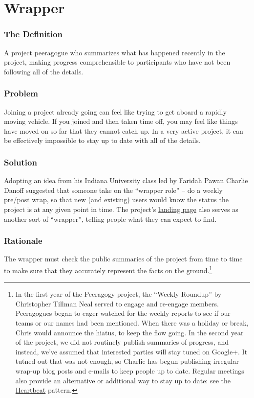 \section{Wrapper}\label{sec:Wrapper}
\subsubsection*{The Definition} A project peeragogue who summarizes what has happened recently in the project, making progress comprehensible to participants who have not been following all of the details.

\subsubsection*{Problem} Joining a project already going can feel like trying to get aboard a rapidly moving vehicle. If you joined and then taken time off, you may feel like things have moved on so far that they cannot catch up. In a very active project, it can be effectively impossible to stay up to date with all of the details.

\subsubsection*{Solution}
Adopting an idea from his Indiana University class led by Faridah Pawan Charlie Danoff suggested that someone take on the ``wrapper role'' -- do a weekly pre/post wrap, so that new (and existing) users would know the status the project is at any given point in time. The project's \href{http://socialmediaclassroom.com/host/peeragogy/}{landing page} also serves as another sort of ``wrapper'', telling people what they can expect to find.

\subsubsection*{Rationale}
The wrapper must check the public summaries of the project from time to time to make sure that they accurately represent the facts on the ground.\footnote{In the first year of the Peeragogy project, the ``Weekly Roundup'' by Christopher Tillman Neal served to engage and re-engage members. Peeragogues began to eager watched for the weekly reports to see if our teams or our names had been mentioned. When there was a holiday or break, Chris would announce the hiatus, to keep the flow going. In the second year of the project, we did not routinely publish summaries of progress, and instead, we've assumed that interested parties will stay tuned on Google+. It tutned out that was not enough, so Charlie has begun publishing irregular wrap-up blog posts and e-mails to keep people up to date. Regular meetings also provide an alternative or additional way to stay up to date: see the \href{http://peeragogy.org/patterns/heartbeat/}{Heartbeat} pattern.}

